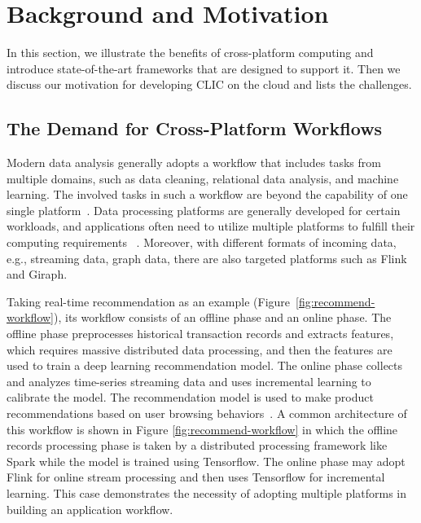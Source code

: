 
\section{Background and Motivation}
In this section, we illustrate the benefits of cross-platform computing and introduce state-of-the-art frameworks that are designed to support it. Then we discuss our motivation for developing CLIC on the cloud and lists the challenges.

\subsection{The Demand for Cross-Platform Workflows}

Modern data analysis generally adopts a workflow that includes tasks from multiple domains, such as data cleaning, relational data analysis, and machine learning. The involved tasks in such a workflow are beyond the capability of one single platform~\cite{tsoumakos2013case, gadepally2015d4m}. Data processing platforms are generally developed for certain workloads, and applications often need to utilize multiple platforms to fulfill their computing requirements ~\cite{wang2017myria, lu2019multi, tan2017enabling}. Moreover, with different formats of incoming data, e.g., streaming data, graph data, there are also targeted platforms such as Flink and Giraph.

Taking real-time recommendation as an example (Figure~\ref{fig:recommend-workflow}), its workflow consists of an offline phase and an online phase. The offline phase preprocesses historical transaction records and extracts features, which requires massive distributed data processing, and then the features are used to train a deep learning recommendation model. The online phase collects and analyzes time-series streaming data and uses incremental learning to calibrate the model. The recommendation model is used to make product recommendations based on user browsing behaviors~\cite{huang2015tencentrec}. A common architecture of this workflow is shown in Figure \ref{fig:recommend-workflow} in which the offline records processing phase is taken by a distributed processing framework like Spark while the model is trained using Tensorflow. The online phase may adopt Flink for online stream processing and then uses Tensorflow for incremental learning. This case demonstrates the necessity of adopting multiple platforms in building an application workflow.


